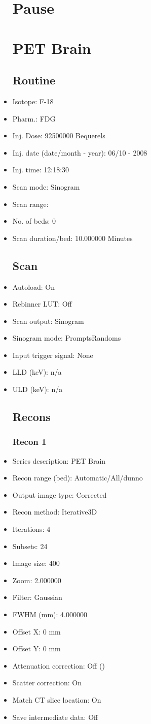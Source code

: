 \documentclass[12pt]{article}
\begin{document}
\begin{itemize}
\section{Pause}
\section{PET Brain}\subsection{Routine}
\item Isotope: F-18
\item Pharm.: FDG
\item Inj. Dose: 92500000 Bequerels
\item Inj. date (date/month - year): 06/10 - 2008
\item Inj. time: 12:18:30
\item Scan mode: Sinogram
\item Scan range: 
\item No. of beds: 0
\item Scan duration/bed: 10.000000 Minutes
\subsection{Scan}
\item Autoload: On
\item Rebinner LUT: Off
\item Scan output: Sinogram
\item Sinogram mode: PromptsRandoms
\item Input trigger signal: None
\item LLD (keV): n/a
\item ULD (keV): n/a
\subsection{Recons}
\subsubsection{Recon 1}
\item Series description: PET Brain
\item Recon range (bed): Automatic/All/dunno
\item Output image type: Corrected
\item Recon method: Iterative3D
\item Iterations: 4
\item Subsets: 24
\item Image size: 400
\item Zoom: 2.000000
\item Filter: Gaussian
\item FWHM (mm): 4.000000
\item Offset X: 0 mm
\item Offset Y: 0 mm
\item Attenuation correction: Off ()
\item Scatter correction: On
\item Match CT slice location: On
\item Save intermediate data: Off
\end{itemize}
\end{document}
